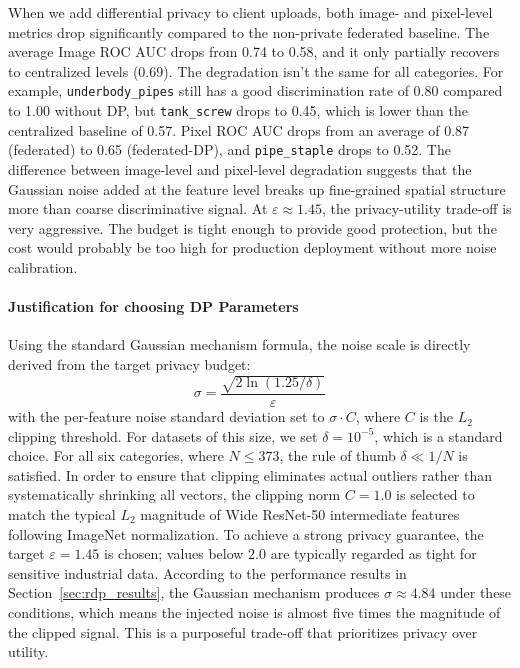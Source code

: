 \documentclass{article}
\begin{document}
When we add differential privacy to client uploads, both image- and pixel-level metrics drop significantly compared to the non-private federated baseline. The average Image ROC AUC drops from 0.74 to 0.58, and it only partially recovers to centralized levels (0.69). The degradation isn't the same for all categories. For example, \texttt{underbody\_pipes} still has a good discrimination rate of 0.80 compared to 1.00 without DP, but \texttt{tank\_screw} drops to 0.45, which is lower than the centralized baseline of 0.57. Pixel ROC AUC drops from an average of 0.87 (federated) to 0.65 (federated-DP), and \texttt{pipe\_staple} drops to 0.52. The difference between image-level and pixel-level degradation suggests that the Gaussian noise added at the feature level breaks up fine-grained spatial structure more than coarse discriminative signal. At $\varepsilon \approx 1.45$, the privacy-utility trade-off is very aggressive. The budget is tight enough to provide good protection, but the cost would probably be too high for production deployment without more noise calibration.

\paragraph*{Justification for choosing DP Parameters}

Using the standard Gaussian mechanism formula, the noise scale is directly derived from the target privacy budget: \begin{equation} \sigma = \frac{\sqrt{2 \ln(1.25 / \delta)}}{\varepsilon} \end{equation} with the per-feature noise standard deviation set to $\sigma \cdot C$, where $C$ is the $L_2$ clipping threshold. For datasets of this size, we set $\delta = 10^{-5}$, which is a standard choice. For all six categories, where $N \leq 373$, the rule of thumb $\delta \ll 1/N$ is satisfied. 
In order to ensure that clipping eliminates actual outliers rather than systematically shrinking all vectors, the clipping norm $C = 1.0$ is selected to match the typical $L_2$ magnitude of Wide ResNet-50 intermediate features following ImageNet normalization. 
To achieve a strong privacy guarantee, the target $\varepsilon = 1.45$ is chosen; values below $2.0$ are typically regarded as tight for sensitive industrial data. According to the performance results in Section~\ref{sec:rdp_results}, the Gaussian mechanism produces $\sigma \approx 4.84$ under these conditions, which means the injected noise is almost five times the magnitude of the clipped signal. This is a purposeful trade-off that prioritizes privacy over utility.
\end{document}
